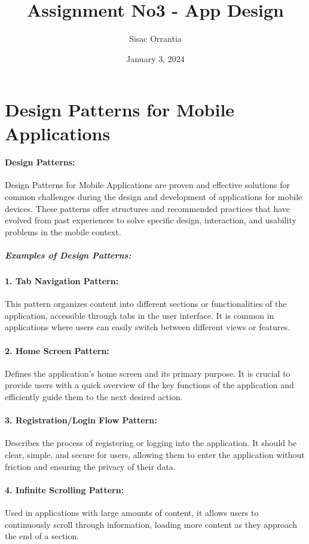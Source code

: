 \documentclass{article}
\title {Assignment No3 - App Design}
\author {Sisac Orrantia}
\date {January 3, 2024}
\begin{document}
\maketitle{}
\section{Design Patterns for Mobile Applications}

\paragraph{Design Patterns:}
Design Patterns for Mobile Applications are proven and effective solutions for common challenges during the design and development of applications for mobile devices. These patterns offer structures and recommended practices that have evolved from past experiences to solve specific design, interaction, and usability problems in the mobile context.

\subparagraph{Examples of Design Patterns:}
\paragraph{1. Tab Navigation Pattern:}
This pattern organizes content into different sections or functionalities of the application, accessible through tabs in the user interface. It is common in applications where users can easily switch between different views or features.

\paragraph{2. Home Screen Pattern:}
Defines the application's home screen and its primary purpose. It is crucial to provide users with a quick overview of the key functions of the application and efficiently guide them to the next desired action.

\paragraph{3. Registration/Login Flow Pattern:}
Describes the process of registering or logging into the application. It should be clear, simple, and secure for users, allowing them to enter the application without friction and ensuring the privacy of their data.

\paragraph{4. Infinite Scrolling Pattern:}
Used in applications with large amounts of content, it allows users to continuously scroll through information, loading more content as they approach the end of a section.
\end{document}
